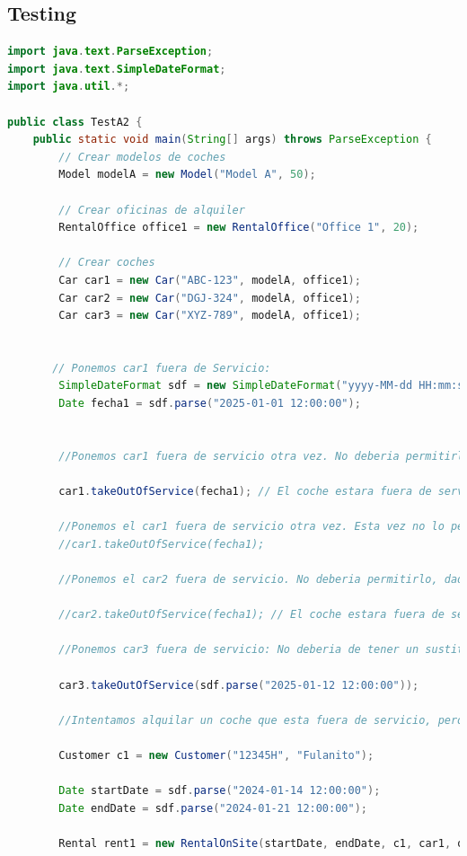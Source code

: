 \subsection{Testing}
\begin{lstlisting}[style = javaNormal, language=Java]
    import java.text.ParseException;
import java.text.SimpleDateFormat;
import java.util.*;

public class TestA2 {
    public static void main(String[] args) throws ParseException {
        // Crear modelos de coches
        Model modelA = new Model("Model A", 50);

        // Crear oficinas de alquiler
        RentalOffice office1 = new RentalOffice("Office 1", 20);

        // Crear coches
        Car car1 = new Car("ABC-123", modelA, office1);
        Car car2 = new Car("DGJ-324", modelA, office1);
        Car car3 = new Car("XYZ-789", modelA, office1);


       // Ponemos car1 fuera de Servicio:
        SimpleDateFormat sdf = new SimpleDateFormat("yyyy-MM-dd HH:mm:ss");
        Date fecha1 = sdf.parse("2025-01-01 12:00:00");


        //Ponemos car1 fuera de servicio otra vez. No deberia permitirlo

        car1.takeOutOfService(fecha1); // El coche estara fuera de servicio hasta 1 de enero del 2025 y se le asocia el car2

        //Ponemos el car1 fuera de servicio otra vez. Esta vez no lo permite
        //car1.takeOutOfService(fecha1);

        //Ponemos el car2 fuera de servicio. No deberia permitirlo, dado que car2 es sustituto de car1

        //car2.takeOutOfService(fecha1); // El coche estara fuera de servicio hasta 1 de enero del 2025

        //Ponemos car3 fuera de servicio: No deberia de tener un sustituto

        car3.takeOutOfService(sdf.parse("2025-01-12 12:00:00"));

        //Intentamos alquilar un coche que esta fuera de servicio, pero que tiene un sustituto

        Customer c1 = new Customer("12345H", "Fulanito");

        Date startDate = sdf.parse("2024-01-14 12:00:00");
        Date endDate = sdf.parse("2024-01-21 12:00:00");

        Rental rent1 = new RentalOnSite(startDate, endDate, c1, car1, office1); // No funciona bien


\end{lstlisting}
